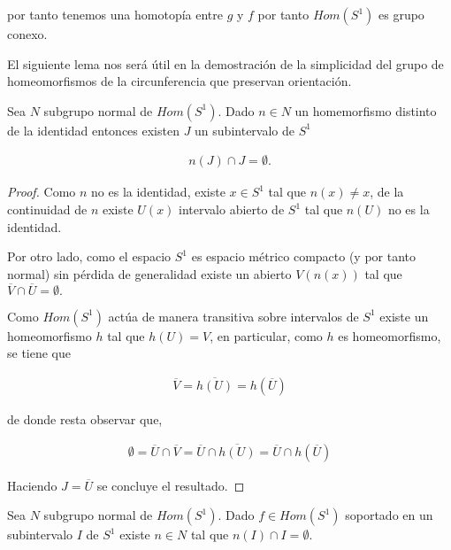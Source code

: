 por tanto tenemos una homotopía entre $g$ y $f$ por tanto $Hom(S^1)$ es grupo conexo.

El siguiente lema nos será útil en la demostración de la simplicidad del grupo de homeomorfismos de la circunferencia que preservan orientación. 


\begin{lm}
Sea $N$ subgrupo normal  de $Hom(S^1)$. Dado $n \in N$ un homemorfismo distinto de la identidad entonces existen $J$ un subintervalo de $S^1$ 

\begin{align*}
n(J) \cap J = \emptyset.
\end{align*}
\end{lm}

\begin{proof}
Como $n$ no es la identidad, existe $x \in S^1$ tal que $n(x) \neq x$, de la continuidad de $n$ existe $U(x)$ intervalo abierto de $S^1$ tal que $n(U)$ no es la identidad.

Por otro lado, como el espacio $S^1$ es espacio métrico compacto (y por tanto normal) sin pérdida de generalidad existe un abierto $V(n(x)) $ tal que $\overline{V} \cap \overline{U} = \emptyset. $ 

Como $Hom(S^1)$ actúa de manera transitiva sobre intervalos de $S^1$ existe un homeomorfismo $h$ tal que $h(U)=V$, en particular, como $h$ es homeomorfismo, se tiene que 

\begin{align*}
\overline{V}=\overline{h(U)}=h(\overline{U})
\end{align*}

de donde resta observar que, 

\begin{align*}
\emptyset=\overline{U} \cap \overline{V} = \overline{U} \cap \overline{h(U)}=\overline{U} \cap h(\overline{U})
\end{align*}

Haciendo $J = \overline{U}$ se concluye el resultado. 
\end{proof}


\begin{lm}\label{lm:homeo_separador_de_intervalos}
Sea $N$ subgrupo normal  de $Hom(S^1)$. Dado $f \in Hom(S^1)$ soportado en un subintervalo $I$ de $S^1$ existe $n \in N$ tal que $n(I) \cap I = \emptyset.$
\end{lm}

